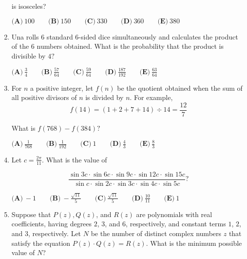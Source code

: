 \documentclass{article}
\begin{document}
\begin{enumerate}[label=\arabic*., itemsep=0.5em]
is isosceles? 

\(\textbf{(A)} \: 100 \qquad\textbf{(B)} \: 150 \qquad\textbf{(C)} \: 330 \qquad\textbf{(D)} \: 360 \qquad\textbf{(E)} \: 380\)\par \vspace{0.5em}\item Una rolls \(6\) standard \(6\)-sided dice simultaneously and calculates the product of the \(6{ }\) numbers obtained. What is the probability that the product is divisible by \(4?\)

\(\textbf{(A)}\: \frac34\qquad\textbf{(B)} \: \frac{57}{64}\qquad\textbf{(C)} \: \frac{59}{64}\qquad\textbf{(D)} \: \frac{187}{192}\qquad\textbf{(E)} \: \frac{63}{64}\)\par \vspace{0.5em}\item For \(n\) a positive integer, let \(f(n)\) be the quotient obtained when the sum of all positive divisors of \(n\) is divided by \(n.\) For example, 
\begin{equation*}
f(14)=(1+2+7+14)\div 14=\frac{12}{7}
\end{equation*}

What is \(f(768)-f(384)?\)

\(\textbf{(A)}\ \frac{1}{768} \qquad\textbf{(B)}\ \frac{1}{192} \qquad\textbf{(C)}\ 1 \qquad\textbf{(D)}\
\frac{4}{3} \qquad\textbf{(E)}\ \frac{8}{3}\)\par \vspace{0.5em}\item Let \(c = \frac{2\pi}{11}.\) What is the value of

\begin{equation*}
\frac{\sin 3c \cdot \sin 6c \cdot \sin 9c \cdot \sin 12c \cdot \sin 15c}{\sin c \cdot \sin 2c \cdot \sin 3c \cdot \sin 4c \cdot \sin 5c}?
\end{equation*}


\(\textbf{(A)}\ {-}1 \qquad\textbf{(B)}\ {-}\frac{\sqrt{11}}{5} \qquad\textbf{(C)}\ \frac{\sqrt{11}}{5} \qquad\textbf{(D)}\
\frac{10}{11} \qquad\textbf{(E)}\ 1\)\par \vspace{0.5em}\item Suppose that \(P(z), Q(z)\), and \(R(z)\) are polynomials with real coefficients, having degrees \(2\), \(3\), and \(6\), respectively, and constant terms \(1\), \(2\), and \(3\), respectively. Let \(N\) be the number of distinct complex numbers \(z\) that satisfy the equation \(P(z) \cdot Q(z)=R(z)\). What is the minimum possible value of \(N\)?


\end{enumerate}
\end{document}
